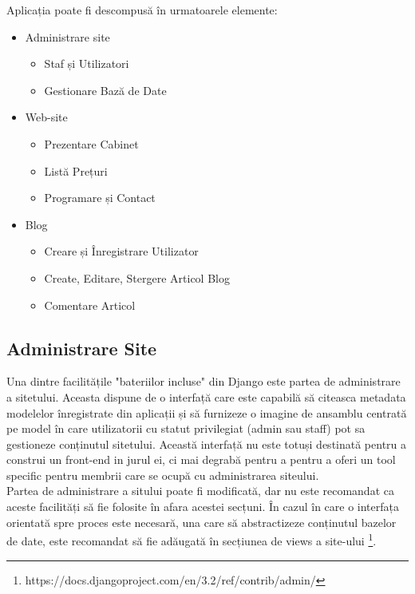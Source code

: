 \documentclass[11pt]{scrartcl} %
\begin{document}
Aplicația poate fi descompusă în urmatoarele elemente:

\begin{itemize}
	\item Administrare site
		\begin{itemize}
			\item Staf și Utilizatori
			\item Gestionare Bază de Date
		\end{itemize}
	\item Web-site
		\begin{itemize}
			\item Prezentare Cabinet
			\item Listă Prețuri
			\item Programare și Contact
		\end{itemize}
	\item Blog
		\begin{itemize}
			\item Creare și Înregistrare Utilizator
			\item Create, Editare, Stergere Articol Blog
			\item Comentare Articol
		\end{itemize}
\end{itemize}


\subsection{Administrare Site}


Una dintre facilitățile "bateriilor incluse" din Django este partea de administrare a sitetului. Aceasta dispune de o interfață care este capabilă să citeasca metadata modelelor înregistrate din aplicații și să furnizeze o imagine de ansamblu centrată pe model în care utilizatorii cu statut privilegiat (admin sau staff) pot sa gestioneze conținutul sitetului. Această interfață nu este totuși destinată pentru a construi un front-end in jurul ei, ci mai degrabă pentru a pentru a oferi un tool specific pentru membrii care se ocupă cu administrarea siteului.\\
Partea de administrare a sitului poate fi modificată, dar nu este recomandat ca aceste facilități să fie folosite în afara acestei secțuni. În cazul în care o interfața orientată spre proces este necesară, una care să abstractizeze conținutul bazelor de date, este recomandat să fie adăugată în secțiunea de views a site-ului \footnote{https://docs.djangoproject.com/en/3.2/ref/contrib/admin/}. 
\end{document}
